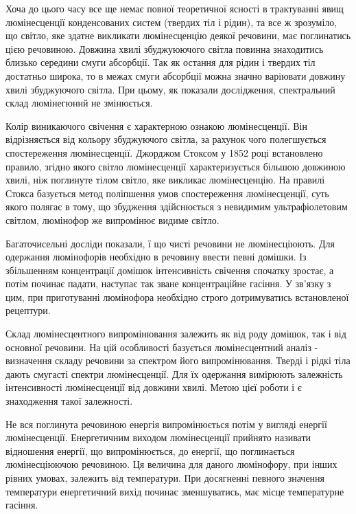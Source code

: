 \documentclass[twocolumn]{el-author}
\begin{document}
Хоча до цього часу все ще немає повної теоретичної ясності в
трактуванні явищ люмінесценції конденсованих систем (твердих тіл і рідин),
та все ж зрозуміло, що світло, яке здатне викликати люмінесценцію деякої
речовини, має поглинатись цією речовиною. Довжина хвилі збуджуюючого
світла повинна знаходитись близько середини смуги абсорбції. Так як
остання для рідин і твердих тіл достатньо широка, то в межах смуги
абсорбції можна значно варіювати довжину хвилі збуджуючого світла. При
цьому, як показали дослідження, спектральний склад люмінегюннй не
змінюється.

Колір виникаючого свічення є характерною ознакою люмінесценції.
Він відрізняється від кольору збуджуючого світла, за рахунок чого
полегшується спостереження люмінесценції. Джорджом Стоксом у 1852 році
встановлено правило, згідно якого світло люмінесценції характеризується
більшою довжиною хвилі, ніж поглинуте тілом світло, яке викликає
люмінесценцію. На правилі Стокса базується метод поліпшення умов
спостереження люмінесценції, суть якого полягає в тому, що збудження
здійснюється з невидимим ультрафіолетовим світлом, люмінофор же
випромінює видиме світло.

Багаточисельні досліди показали, ї що чисті речовини не
люмінесціюють. Для одержання люмінофорів необхідно в речовину ввести
певні домішки. Із збільшенням концентрації домішок інтенсивність свічення
спочатку зростає, а потім починає падати, наступає так зване концентраційне
гасіння. У зв'язку з цим, при приготуванні люмінофора необхідно строго
дотримуватись встановленої рецептури.

Склад люмінесцентного випромінювання залежить як від роду
домішок, так і від основної речовини. На цій особливості базується
люмінесцентний аналіз - визначення складу речовини за спектром його
випромінювання. Тверді і рідкі тіла дають смугасті спектри люмінесценції.
Для їх одержання вимірюють залежність інтенсивності люмінесценції від
довжини хвилі. Метою цієї роботи і є знаходження такої залежності.

Не вся поглинута речовиною енергія випромінюється потім у вигляді
енергії люмінесценції. Енергетичним виходом люмінесценції прийнято
називати відношення енергії, що випромінюється, до енергії, що
поглинається  люмінесціюючою речовиною. Ця величина для даного
люмінофору, при інших рівних умовах, залежить від температури. При
досягненні певного значення температури енергетичний вихід починає
зменшуватись, має місце температурне гасіння.
\end{document}
